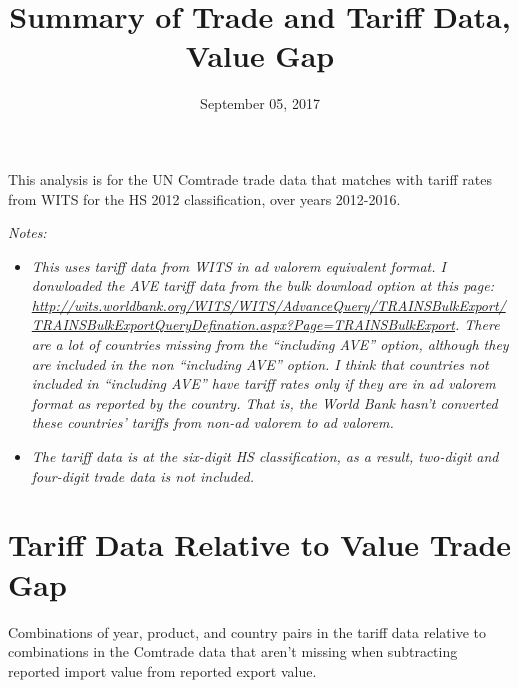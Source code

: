 \documentclass[10pt,]{article}
\title{Summary of Trade and Tariff Data, Value Gap}
\author{}
\date{September 05, 2017}
\begin{document}
\maketitle

This analysis is for the UN Comtrade trade data that matches with tariff
rates from WITS for the HS 2012 classification, over years 2012-2016.

\emph{Notes:}

\begin{itemize}
\item
  \emph{This uses tariff data from WITS in ad valorem equivalent format.
  I donwloaded the AVE tariff data from the bulk download option at this
  page:
  \url{http://wits.worldbank.org/WITS/WITS/AdvanceQuery/TRAINSBulkExport/TRAINSBulkExportQueryDefination.aspx?Page=TRAINSBulkExport}.
  There are a lot of countries missing from the ``including AVE''
  option, although they are included in the non ``including AVE''
  option. I think that countries not included in ``including AVE'' have
  tariff rates only if they are in ad valorem format as reported by the
  country. That is, the World Bank hasn't converted these countries'
  tariffs from non-ad valorem to ad valorem.}
\item
  \emph{The tariff data is at the six-digit HS classification, as a
  result, two-digit and four-digit trade data is not included.}
\end{itemize}

\section{Tariff Data Relative to Value Trade
Gap}\label{tariff-data-relative-to-value-trade-gap}

Combinations of year, product, and country pairs in the tariff data
relative to combinations in the Comtrade data that aren't missing when
subtracting reported import value from reported export value.
\end{document}
